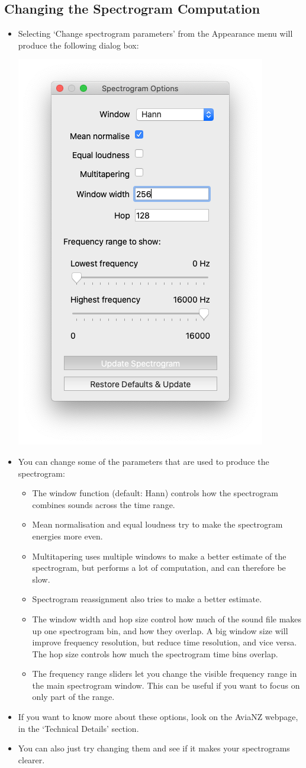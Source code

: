 \documentclass{article}
\begin{document}
\subsection{Changing the Spectrogram Computation}\label{sec:spectrogram2}

\begin{itemize}
\item Selecting `Change spectrogram parameters' from the Appearance menu will produce the following dialog box:

\begin{center}
    \includegraphics[width=.4\textwidth]{Figures/SpectrogramOptions}
\end{center}

\item You can change some of the parameters that are used to produce the spectrogram:

\begin{itemize}
\item The window function (default: Hann) controls how the spectrogram combines sounds across the time range. 
\item Mean normalisation and equal loudness try to make the spectrogram energies more even.
\item Multitapering uses multiple windows to make a better estimate of the spectrogram, but performs a lot of computation, and can therefore be slow.
\item Spectrogram reassignment also tries to make a better estimate.
\item The window width and hop size control how much of the sound file makes up one spectrogram bin, and how they overlap. A big window size will improve frequency resolution, but reduce time resolution, and vice versa. The hop size controls how much the spectrogram time bins overlap. 
\item The frequency range sliders let you change the visible frequency range in the main spectrogram window. This can be useful if you want to focus on only part of the range.
\end{itemize}

\item If you want to know more about these options, look on the AviaNZ webpage, in the `Technical Details' section. 
\item You can also just try changing them and see if it makes your spectrograms clearer.
\end{itemize}
\end{document}
